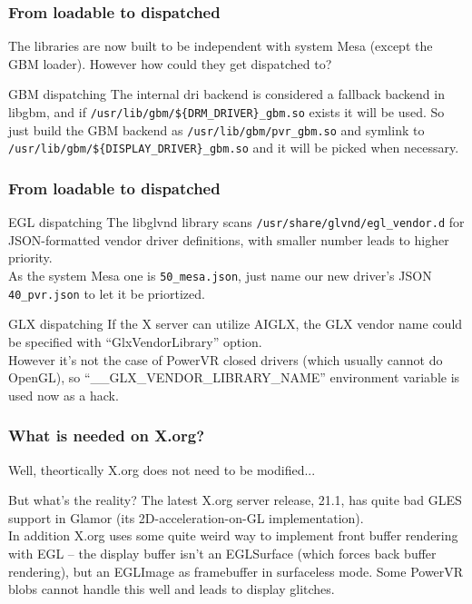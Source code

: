 \documentclass{beamer}
\begin{document}
\begin{frame}
	\frametitle{From loadable to dispatched}
	The libraries are now built to be independent with system Mesa (except the GBM loader). However how could they get dispatched to?
	\begin{block}{GBM dispatching}
		The internal dri backend is considered a fallback backend in libgbm, and if \texttt{/usr/lib/gbm/\$\{DRM\_DRIVER\}\_gbm.so} exists it will be used. So just build the GBM backend as \texttt{/usr/lib/gbm/pvr\_gbm.so} and symlink to \texttt{/usr/lib/gbm/\$\{DISPLAY\_DRIVER\}\_gbm.so} and it will be picked when necessary.
	\end{block}
\end{frame}

\begin{frame}
	\frametitle{From loadable to dispatched}
	\begin{block}{EGL dispatching}
		The libglvnd library scans \texttt{/usr/share/glvnd/egl\_vendor.d} for JSON-formatted vendor driver definitions, with smaller number leads to higher priority. \\
		As the system Mesa one is \texttt{50\_mesa.json}, just name our new driver's JSON \texttt{40\_pvr.json} to let it be priortized.
	\end{block}
	\begin{block}{GLX dispatching}
		If the X server can utilize AIGLX, the GLX vendor name could be specified with ``GlxVendorLibrary'' option. \\
		However it's not the case of PowerVR closed drivers (which usually cannot do OpenGL), so ``\_\_GLX\_VENDOR\_LIBRARY\_NAME'' environment variable is used now as a hack.
	\end{block}

\end{frame}

\begin{frame}
	\frametitle{What is needed on X.org?}
	Well, theortically X.org does not need to be modified...
	\begin{block}{But what's the reality?}
		The latest X.org server release, 21.1, has quite bad GLES support in Glamor (its 2D-acceleration-on-GL implementation). \\
		In addition X.org uses some quite weird way to implement front buffer rendering with EGL -- the display buffer isn't an EGLSurface (which forces back buffer rendering), but an EGLImage as framebuffer in surfaceless mode. Some PowerVR blobs cannot handle this well and leads to display glitches.
	\end{block}
\end{frame}
\end{document}
